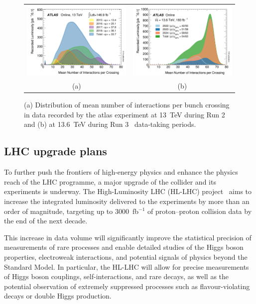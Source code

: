 \begin{figure}[htbp]
    \centering
    \begin{tabular}{cc}
        \includegraphics[width=0.5\linewidth]{images/mu_2015_2018.png} &
        \includegraphics[width=0.5\linewidth]{images/mu_2022_2024.png} \\
        (a) & (b)  \\
    \end{tabular}
    \caption{(a) Distribution of mean number of interactions per bunch crossing in data recorded by the \acrshort{atlas} experiment at 13~TeV during Run 2~\cite{atlas:Run2lumi} and  (b) at 13.6~TeV during Run 3~\cite{atlas:Run2lumi} data-taking periods.}
    \label{fig:pileup}
    \end{figure}
\subsection*{LHC upgrade plans}

To further push the frontiers of high-energy physics and enhance the physics reach of the LHC programme, a major upgrade of the collider and its experiments is underway. The High-Luminosity LHC (HL-LHC) project~\cite{HLLHC} aims to increase the integrated luminosity delivered to the experiments by more than an order of magnitude, targeting up to 3000~fb$^{-1}$ of proton--proton collision data by the end of the next decade.

This increase in data volume will significantly improve the statistical precision of measurements of rare processes and enable detailed studies of the Higgs boson properties, electroweak interactions, and potential signals of physics beyond the Standard Model. In particular, the HL-LHC will allow for precise measurements of Higgs boson couplings, self-interactions, and rare decays, as well as the potential observation of extremely suppressed processes such as flavour-violating decays or double Higgs production.

